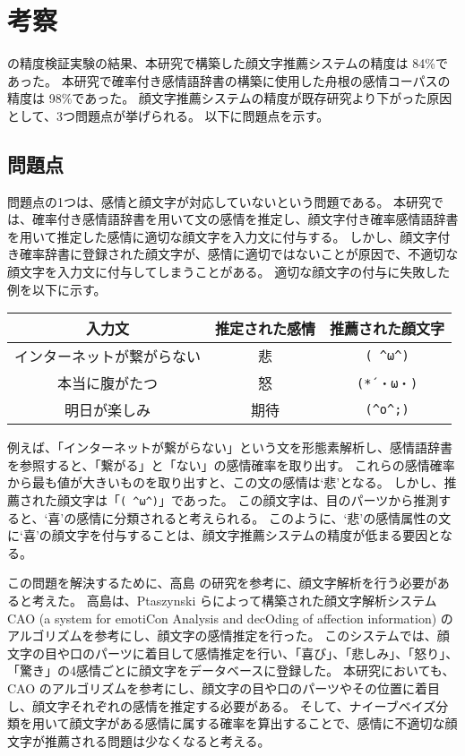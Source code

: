 \documentclass[11pt,a4j]{jsarticle}
\begin{document}
\section{考察}\label{sec:analyze}
の精度検証実験の結果、本研究で構築した顔文字推薦システムの精度は 84\%であった。
本研究で確率付き感情語辞書の構築に使用した舟根の感情コーパスの精度は 98\%であった。
顔文字推薦システムの精度が既存研究より下がった原因として、3つ問題点が挙げられる。
以下に問題点を示す。

\subsection{問題点}
問題点の1つは、感情と顔文字が対応していないという問題である。
本研究では、確率付き感情語辞書を用いて文の感情を推定し、顔文字付き確率感情語辞書を用いて推定した感情に適切な顔文字を入力文に付与する。
しかし、顔文字付き確率辞書に登録された顔文字が、感情に適切ではないことが原因で、不適切な顔文字を入力文に付与してしまうことがある。
適切な顔文字の付与に失敗した例を以下に示す。

\begin{table}[htb]
  \centering
  \begin{tabular}{c||c|c} \hline
    入力文 & 推定された感情 & 推薦された顔文字 \\ \hline
    インターネットが繋がらない & 悲 & \verb|( ^ω^)| \\
    本当に腹がたつ & 怒 & \verb|(*´・ω・)|   \\
    明日が楽しみ & 期待 & \verb|(^o^;)| \\ \hline
  \end{tabular}
\end{table}

例えば、「インターネットが繋がらない」という文を形態素解析し、感情語辞書を参照すると、「繋がる」と「ない」の感情確率を取り出す。
これらの感情確率から最も値が大きいものを取り出すと、この文の感情は`悲'となる。
しかし、推薦された顔文字は「\verb|( ^ω^)|」であった。
この顔文字は、目のパーツから推測すると、`喜'の感情に分類されると考えられる。
このように、`悲'の感情属性の文に`喜'の顔文字を付与することは、顔文字推薦システムの精度が低まる要因となる。

この問題を解決するために、高島  の研究を参考に、顔文字解析を行う必要があると考えた。
高島は、Ptaszynski らによって構築された顔文字解析システム CAO (a system for emotiCon Analysis and decOding of affection information) のアルゴリズムを参考にし、顔文字の感情推定を行った。
このシステムでは、顔文字の目や口のパーツに着目して感情推定を行い、「喜び」、「悲しみ」、「怒り」、「驚き」の4感情ごとに顔文字をデータベースに登録した。
本研究においても、CAO のアルゴリズムを参考にし、顔文字の目や口のパーツやその位置に着目し、顔文字それぞれの感情を推定する必要がある。
そして、ナイーブベイズ分類を用いて顔文字がある感情に属する確率を算出することで、感情に不適切な顔文字が推薦される問題は少なくなると考える。
\end{document}
